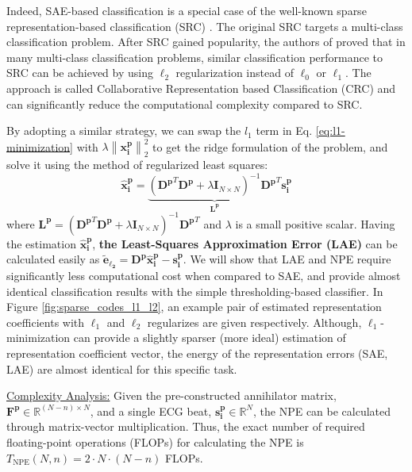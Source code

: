 \documentclass[journal,transmag]{IEEEtran}
\begin{document}
Indeed, SAE-based classification is a special case of the well-known sparse representation-based classification (SRC) \cite{SRC1}. The original SRC targets a multi-class classification problem. After SRC gained popularity, the authors of \cite{collaborative} proved that in many multi-class classification problems, similar classification performance to SRC can be achieved by using $\ell_2$ regularization instead of $\ell_0$ or $\ell_1$. The approach is called Collaborative Representation based Classification (CRC) and can significantly reduce the computational complexity compared to SRC.

By adopting a similar strategy, we can swap the $l_1$ term in Eq. \eqref{eq:l1-minimization} with $\lambda \left\| \bm{x_i^p} \right\|_2^2$ to get the ridge formulation of the problem, and solve it using the method of regularized least squares: 
\begin{equation} \label{eq:l2-solution}
    \bm{\widehat{x}_i^p} = \underbrace{\left({\bm{D^p}}^T \bm{D^p} + \lambda \bm{I}_{N \times N} \right)^{-1}{\bm{D^p}}^T}_{\bm{L^p}} \bm{s_i^p}
\end{equation}
where $\bm{L^p} = \left({\bm{D^p}}^T \bm{D^p} + \lambda \bm{I}_{N \times N} \right)^{-1}{\bm{D^p}}^T $ and $\lambda$ is a small positive scalar. Having the estimation $\bm{\widehat{x}_i^p} $, \textbf{the Least-Squares Approximation Error (LAE)} can be calculated easily as $\bm{\widetilde{e}_{\ell_2}} = \bm{D^p} {\bm{\hat{x}^p_i}}-\bm{s^p_i} $. We will show that LAE and NPE require significantly less computational cost when compared to SAE, and provide almost identical classification results with the simple thresholding-based classifier. In Figure \ref{fig:sparse_codes_l1_l2}, an example pair of estimated representation coefficients with $\ell_1$ and $\ell_2$ regularizes are given respectively. Although, $\ell_1$-minimization can provide a slightly sparser (more ideal) estimation of representation coefficient vector, the energy of the representation errors (SAE, LAE) are almost identical for this specific task.

\underline{Complexity Analysis:} Given the pre-constructed annihilator matrix, $\bm{F^p} \in \mathbb{R}^{(N - n) \times N}$, and a single ECG beat, $\bm{s_i^p} \in \mathbb{R}^{N}$, the NPE can be calculated through matrix-vector multiplication. Thus, the exact number of required floating-point operations (FLOPs) for calculating the NPE is $T_{\text{NPE}}(N, n) = 2 \cdot N \cdot \left(N - n\right)$ FLOPs.
\end{document}
